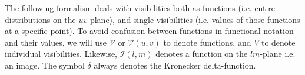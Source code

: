 \documentclass[useAMS,usenatbib]{mn2e}
\begin{document}
\newcommand{\VV}{\mathcal{V}}
\newcommand{\PP}{\mathcal{P}}
\newcommand{\VVM}{\mathcal{V}^\mathrm{M}}
\newcommand{\WW}{\mathcal{W}}
\newcommand{\II}{\mathcal{I}}
\newcommand{\IID}{\mathcal{I}^\mathrm{D}}
\newcommand{\IIDI}{\mathcal{I}^\mathrm{DI}}
\newcommand{\EE}{\mathcal{E}}
\newcommand{\FF}{\mathcal{F}}
\newcommand{\HH}{\mathcal{H}}
\newcommand{\TT}{\mathcal{T}}
\newcommand{\NN}{\mathcal{N}}
\newcommand{\uu}{\bmath{u}}
\newcommand{\Btf}{\mathsf{B}^{[\Delta t\Delta\nu]}}
\newcommand{\Babtf}{\mathsf{B}^{[\alpha\Delta t,\beta\Delta\nu]}}
\newcommand{\Bab}{\mathsf{B}^{[\alpha\beta]}}
\newcommand{\Buv}{\mathsf{B}^{[uv]}}
\newcommand{\Bij}{\mathsf{B}}
\newcommand{\Ptf}{\Pi^{[t\nu]}}
\newcommand{\Puv}{\Pi^{[uv]}}
\newcommand{\Vm}{V^\mathrm{M}}
\newcommand{\Vs}{V^\mathrm{S}}
% 
The following formalism deals with visibilities both as functions (i.e. entire distributions on the $uv$-plane), 
and single visibilities (i.e. values of those functions at a specific point). To avoid confusion between functions in
functional notation and their values, we will use $\VV$ or 
$\VV(u,v)$ to denote functions, and $V$ to denote individual visibilities. Likewise, $\II(l,m)$ denotes a function 
on the $lm$-plane i.e. an image. The symbol $\delta$ always denotes the Kronecker delta-function.
\end{document}
